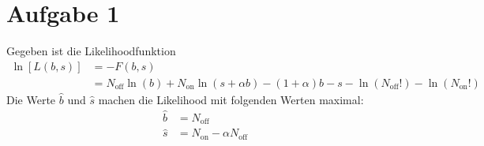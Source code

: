 \section*{Aufgabe 1}

\renewcommand*\t[1]{\text{#1}}

	Gegeben ist die Likelihoodfunktion
	\begin{align*}
		\ln[L(b,s)] &= -F(b,s)	\\
			&= N_\t{off} \ln(b) + N_\t{on} \ln(s + \alpha b) - (1+\alpha)b - s - \ln(N_\t{off}!) - \ln(N_\t{on}!) 
	\end{align*}
	Die Werte $\hat{b}$ und $\hat{s}$ machen die Likelihood mit folgenden Werten maximal:
	\begin{align*}
		\hat{b} &= N_\t{off}	\\
		\hat{s} &= N_\t{on} - \alpha N_\t{off}
	\end{align*}
	
